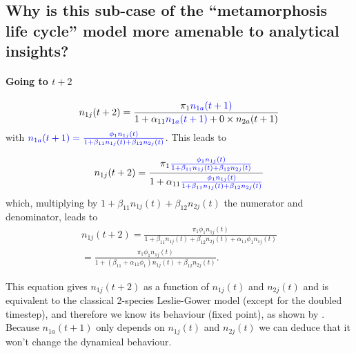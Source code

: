 \documentclass{article}
\begin{document}
\subsection*{Why is this sub-case of the ``metamorphosis life cycle'' model more amenable to analytical insights?}

\paragraph{Going to $t+2$}

\begin{equation}
    n_{1j}(t+2) =  \frac{\pi_1 {\color{blue}n_{1a}(t+1)}}{1+\alpha_{11}{\color{blue}n_{1a}(t+1)}+0 \times n_{2a}(t+1)}
\end{equation}
with $\color{blue}n_{1a}(t+1) = \frac{\phi_1 n_{1j}(t)}{1+\beta_{11}n_{1j}(t)+\beta_{12}n_{2j}(t)}$. This leads to 

\begin{equation}
    n_{1j}(t+2) = \frac{\pi_1 {\color{blue} \frac{\phi_1 n_{1j}(t)}{1+\beta_{11}n_{1j}(t)+\beta_{12}n_{2j}(t)}}}{1+\alpha_{11}{\color{blue} \frac{\phi_1 n_{1j}(t)}{1+\beta_{11}n_{1j}(t)+\beta_{12}n_{2j}(t)}}}
\end{equation}
which, multiplying by $1+\beta_{11}n_{1j}(t)+\beta_{12}n_{2j}(t)$ the numerator and denominator, leads to 
\begin{equation}
\begin{split}
        n_{1j}(t+2) = \frac{\pi_1 \phi_1 n_{1j}(t)}{1+\beta_{11}n_{1j}(t)+\beta_{12}n_{2j}(t) +\alpha_{11}\phi_1 n_{1j}(t)}\\
        = \frac{\pi_1 \phi_1 n_{1j}(t)}{1+(\beta_{11}+\alpha_{11}\phi_1) n_{1j}(t)+\beta_{12}n_{2j}(t)}. 
\end{split}
\end{equation}

This equation gives $n_{1j}(t+2)$ as a function of $n_{1j}(t)$ and $n_{2j}(t)$ and is equivalent to the classical 2-species Leslie-Gower model (except for the doubled timestep), and therefore we know its behaviour (fixed point), as shown by \citet{cushing2007coexistence}.  Because $n_{1a}(t+1)$ only depends on $n_{1j}(t)$ and $n_{2j}(t)$ we can deduce that it won't change the dynamical behaviour.

\newpage
\end{document}
